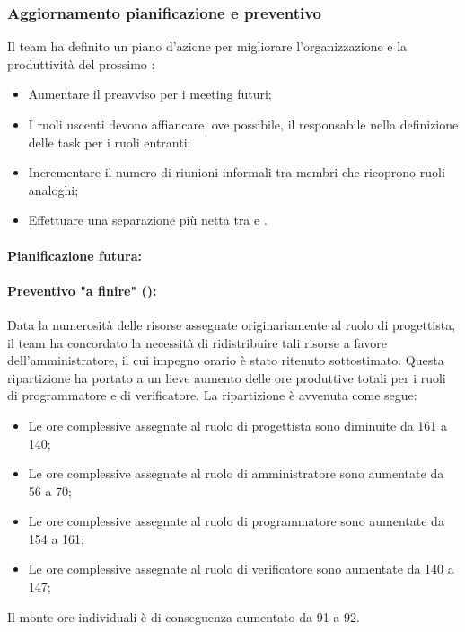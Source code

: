 \subsubsection{Aggiornamento pianificazione e preventivo}
\par Il team ha definito un piano d'azione per migliorare l'organizzazione e la produttività del prossimo :
\begin{itemize}
  \item Aumentare il preavviso per i meeting futuri;
  \item I ruoli uscenti devono affiancare, ove possibile, il responsabile nella definizione delle task per i ruoli entranti;
  \item Incrementare il numero di riunioni informali tra membri che ricoprono ruoli analoghi;
  \item Effettuare una separazione più netta tra  e .
\end{itemize}

\paragraph*{Pianificazione futura:}

\paragraph*{Preventivo "a finire" ():}
\par Data la numerosità delle risorse assegnate originariamente al ruolo di progettista, il team ha concordato la necessità di ridistribuire tali risorse a favore dell'amministratore, il cui impegno orario è stato ritenuto sottostimato. Questa ripartizione ha portato a un lieve aumento delle ore produttive totali per i ruoli di programmatore e di verificatore. 
La ripartizione è avvenuta come segue:
\begin{itemize}
  \item Le ore complessive assegnate al ruolo di progettista sono diminuite da 161 a 140;
  \item Le ore complessive assegnate al ruolo di amministratore sono aumentate da 56 a 70;
  \item Le ore complessive assegnate al ruolo di programmatore sono aumentate da 154 a 161;
  \item Le ore complessive assegnate al ruolo di verificatore sono aumentate da 140 a 147;
\end{itemize}
Il monte ore individuali è di conseguenza aumentato da 91 a 92.

